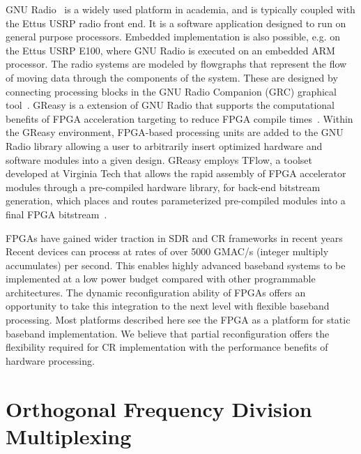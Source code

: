 GNU Radio~\cite{gnuradio} is a widely used platform in academia, and is typically coupled with the Ettus USRP radio front end.
It is a software application designed to run on general purpose processors.
Embedded implementation is also possible, e.g. on the Ettus USRP E100, where GNU Radio is executed on an embedded ARM processor.
The radio systems are modeled by flowgraphs that represent the flow of moving data through the components of the system.
These are designed by connecting processing blocks in the GNU Radio Companion (GRC) graphical tool~\cite{GRC2009}.
GReasy is a extension of GNU Radio that supports the computational benefits of FPGA acceleration targeting to reduce FPGA compile times~\cite{Marlow2014}. Within the GReasy environment, FPGA-based processing units are added to the GNU Radio library allowing a user to arbitrarily insert optimized hardware and software modules into a given design. GReasy employs TFlow, a  toolset developed at Virginia Tech that allows the rapid assembly of FPGA accelerator modules through a pre-compiled hardware library, for back-end bitstream generation, which places and routes parameterized pre-compiled modules into a final FPGA bitstream~\cite{Love2013}.

FPGAs have gained wider traction in SDR and CR frameworks in recent years
Recent devices can process at rates of over 5000 GMAC/s (integer multiply accumulates) per second. This enables highly advanced baseband systems to be implemented at a low power budget compared with other programmable architectures.
The dynamic reconfiguration ability of FPGAs offers an opportunity to take this integration to the next level with flexible baseband processing.
Most platforms described here see the FPGA as a platform for static baseband implementation.
We believe that partial reconfiguration offers the flexibility required for CR implementation with the performance benefits of hardware processing.




\section{Orthogonal Frequency Division Multiplexing}

